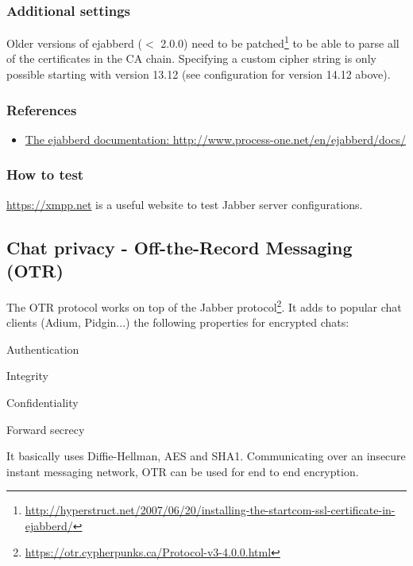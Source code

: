 \subsubsection{Additional settings}
Older versions of ejabberd ($ < $ 2.0.0) need to be patched\footnote{\url{http://hyperstruct.net/2007/06/20/installing-the-startcom-ssl-certificate-in-ejabberd/}} to be able to parse all of the certificates in the CA chain.
Specifying a custom cipher string is only possible starting with version 13.12 (see configuration for version 14.12 above).

\subsubsection{References}

\begin{itemize}
\item \href{http://www.process-one.net/en/ejabberd/docs/}{The ejabberd documentation: http://www.process-one.net/en/ejabberd/docs/}
\end{itemize}


\subsubsection{How to test}
\begin{itemize*}
  \item \url{https://xmpp.net} is a useful website to test Jabber server configurations.
\end{itemize*}


\subsection{Chat privacy - Off-the-Record Messaging (OTR)}

The OTR protocol works on top of the Jabber protocol\footnote{\url{https://otr.cypherpunks.ca/Protocol-v3-4.0.0.html}}.  
It adds to popular chat clients (Adium, Pidgin...) the following properties for encrypted chats:
\begin{itemize*}
  \item Authentication
  \item Integrity
  \item Confidentiality
  \item Forward secrecy
\end{itemize*}

It basically uses Diffie-Hellman, AES and SHA1. Communicating over an insecure instant messaging network, OTR can be used for end to end encryption.

